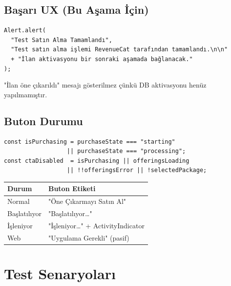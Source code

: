 \documentclass[12pt,a4paper]{article}
\begin{document}
\subsection{Başarı UX (Bu Aşama İçin)}

\begin{lstlisting}[language={}]
Alert.alert(
  "Test Satın Alma Tamamlandı",
  "Test satın alma işlemi RevenueCat tarafından tamamlandı.\n\n"
  + "İlan aktivasyonu bir sonraki aşamada bağlanacak."
);
\end{lstlisting}

"İlan öne çıkarıldı" mesajı gösterilmez çünkü DB aktivasyonu henüz yapılmamıştır.

\subsection{Buton Durumu}

\begin{lstlisting}[language={}]
const isPurchasing = purchaseState === "starting"
                  || purchaseState === "processing";
const ctaDisabled  = isPurchasing || offeringsLoading
                  || !!offeringsError || !selectedPackage;
\end{lstlisting}

\begin{center}
\begin{tabular}{ll}
  \toprule
  \textbf{Durum} & \textbf{Buton Etiketi}\\
  \midrule
  Normal & "Öne Çıkarmayı Satın Al"\\
  Başlatılıyor & "Başlatılıyor\ldots"\\
  İşleniyor & "İşleniyor\ldots" + ActivityIndicator\\
  Web & "Uygulama Gerekli" (pasif)\\
  \bottomrule
\end{tabular}
\end{center}

\section{Test Senaryoları}
\end{document}

